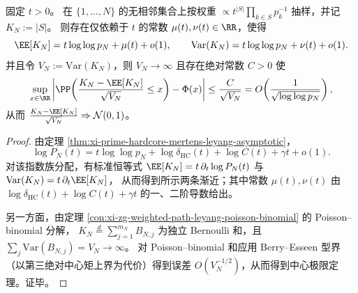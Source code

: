 \begin{theorem}\label{thm:xi-prime-hardcore-gibbs-clt}
固定 \(t>0\)。
在 \(\{1,\dots,N\}\) 的无相邻集合上按权重
\(
\propto t^{|S|}\prod_{k\in S}p_k^{-1}
\)
抽样，并记 \(K_N:=|S|\)。
则存在仅依赖于 \(t\) 的常数 \(\mu(t),\nu(t)\in\RR\)，使得
\[
\EE[K_N]=t\log\log p_N+\mu(t)+o(1),
\qquad
\mathrm{Var}(K_N)=t\log\log p_N+\nu(t)+o(1).
\]
并且令 \(V_N:=\mathrm{Var}(K_N)\)，则 \(V_N\to\infty\) 且存在绝对常数 \(C>0\) 使
\[
\sup_{x\in\RR}\left|
\PP\!\left(\frac{K_N-\EE[K_N]}{\sqrt{V_N}}\le x\right)-\Phi(x)
\right|
\le \frac{C}{\sqrt{V_N}}
=O\!\left(\frac{1}{\sqrt{\log\log p_N}}\right),
\]
从而 \(\frac{K_N-\EE[K_N]}{\sqrt{V_N}}\Rightarrow\mathcal N(0,1)\)。
\end{theorem}
\begin{proof}
由定理 \ref{thm:xi-prime-hardcore-mertens-leyang-asymptotic}，
\[
\log P_N(t)=t\log\log p_N+\log\delta_{\mathrm{HC}}(t)+\log C(t)+\gamma t+o(1).
\]
对该指数族分配，有标准恒等式
\(
\EE[K_N]=t\,\partial_t\log P_N(t)
\)
与
\(
\mathrm{Var}(K_N)=t\,\partial_t\EE[K_N]
\)，
从而得到所示两条渐近；其中常数 \(\mu(t),\nu(t)\) 由 \(\log\delta_{\mathrm{HC}}(t)+\log C(t)+\gamma t\) 的一、二阶导数给出。
\par
另一方面，由定理 \ref{con:xi-zg-weighted-path-leyang-poisson-binomial} 的 Poisson--binomial 分解，
\(
K_N\overset{d}{=}\sum_{j=1}^{m_N}B_{N,j}
\)
为独立 Bernoulli 和，且 \(\sum_j\mathrm{Var}(B_{N,j})=V_N\to\infty\)。
对 Poisson--binomial 和应用 Berry--Esseen 型界（以第三绝对中心矩上界为代价）得到误差 \(O(V_N^{-1/2})\)，从而得到中心极限定理。证毕。
\end{proof}

